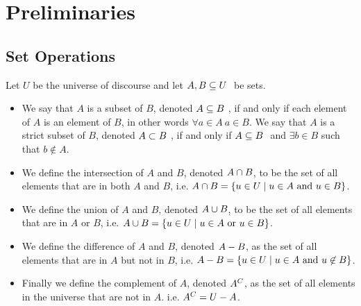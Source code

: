 

\chapter{Preliminaries}
    \section{Set Operations}
        \begin{definition}
            Let $U$ be the universe of discourse and let $A, B \subseteq U \ $ be sets.
            \begin{itemize}
                \item
                    We say that $A$ is a subset of $B$, denoted $A \subseteq B \ $, if and only
                    if each element of $A$ is an element of $B$, in other words 
                    $\forall a \in A \ a \in B$. We say that $A$ is a strict
                    subset of $B$, denoted $A \subset B \ $, if and only if $A \subseteq B \ $
                    and $\exists b \in B$ such that $b \not\in A$.
                \item
                    We define the intersection of $A$ and $B$, denoted $A \cap B$,
                    to be the set of all elements that are in both $A$ and $B$, i.e.
                    $A \cap B = \left\{u \in U \mid u \in A \mbox{ and } u \in B\right\}$.
                \item
                    We define the union of $A$ and $B$, denoted $A \cup B$,
                    to be the set of all elements that are in $A$ or $B$, i.e.
                    $A \cup B = \left\{u \in U \mid u \in A \mbox{ or } u \in B\right\}$.
                \item
                    We define the difference of $A$ and $B$, denoted $A - B$, as
                    the set of all elements that are in $A$ but not in $B$, i.e.
                    $A - B = \left\{u \in U \mid u \in A \mbox{ and } u \not\in B\right\}$.
                \item
                    Finally we define the complement of $A$, denoted $A^{C}$, as the
                    set of all elements in the universe that are not in $A$. i.e.
                    $A^{C} = U - A$.
            \end{itemize}
        \end{definition}
